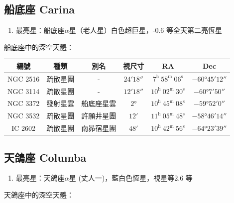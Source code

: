 \subsection{船底座 Carina}
\begin{enumerate}
    \item 最亮星：船底座\(\alpha\)星（老人星）白色超巨星，-0.6 等全天第二亮恆星
\end{enumerate}
船底座中的深空天體：

\begin{center}
\begin{longtable}{c | c | c | c | c | c}
    編號 & 種類 & 別名 & 視尺寸 & RA & Dec \\
    \hline
    \endfirsthead


    \endfoot

    \endlastfoot

    NGC 2516 & 疏散星團 & - & \(\ang{;24;18}\) & \(7^\text{h }58^\text{m }06^\text{s}\) & \(-\ang{60;45;12}\) \\
    NGC 3114 & 疏散星團 & - & \(\ang{;12;18}\) & \(10^\text{h }02^\text{m }30^\text{s}\) & \(-\ang{60;7;50}\) \\
    NGC 3372 & 發射星雲 & 船底座星雲 & \(\ang{2;;}\) & \(10^\text{h }45^\text{m }08^\text{s}\) & \(-\ang{59;52;0}\) \\
    NGC 3532 & 疏散星團 & 許願井星團 & \(\ang{;12;}\) & \(11^\text{h }05^\text{m }48^\text{s}\) & \(-\ang{58;46;14}\) \\
    IC 2602 & 疏散星團 & 南昴宿星團 & \(\ang{;48;}\) & \(10^\text{h }42^\text{m }56^\text{s}\) & \(-\ang{64;23;39}\) \\
\end{longtable}
\end{center}

\subsection{天鴿座 Columba}
\begin{enumerate}
    \item 最亮星：天鴿座\(\alpha\)星 (丈人一)，藍白色恆星，視星等2.6 等
\end{enumerate}
天鴿座中的深空天體：

